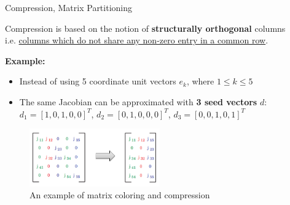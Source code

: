 \ifSpeech
\begin{frame}[t]{Compression, Matrix Partitioning}
    \justifying
    \small
    
    Compression is based on the notion of \textbf{structurally orthogonal} columns\\ 
    i.e. \underline{columns which do not share any non-zero entry in a common row}.
    
    \spc
        
    \textbf{Example:}
        \begin{itemize}
            \item Instead of using 5 coordinate unit vectors $e_{k}$, where $1 \leq k \leq 5 $  
            \item The same Jacobian can be approximated with \textbf{3 seed vectors} $d$: $d_{1} = [1,0,1,0,0]^{T}$, $d_{2} = [0,1,0,0,0]^{T}$, $d_{3} = [0,0,1,0,1]^{T}$
    \end{itemize}

        
    \begin{figure}[htpb]
        \centering
        \includegraphics[width=0.50\textwidth]{figures/chapter-3/matrix-compression-example.png}
        \caption{An example of matrix coloring and compression \cite{gebremedhin2005color}}
        \label{fig:example-of-matrix-compression}
    \end{figure}
    

\end{frame}
\fi

